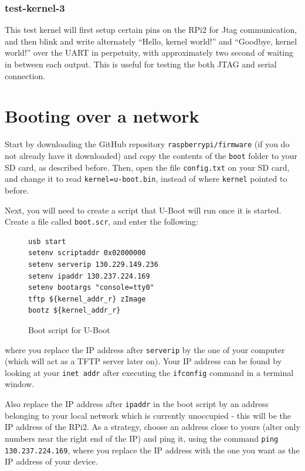 \documentclass[a4paper,11pt,reqno]{amsart}
\begin{document}
\subsubsection{test-kernel-3}
This test kernel will first setup certain pins on the RPi2 for Jtag communication, and then blink and write alternately ``Hello, kernel world!'' and ``Goodbye, kernel world!'' over the UART in perpetuity, with approximately two second of waiting in between each output. This is useful for testing the both JTAG and serial connection.

\section{Booting over a network}
Start by downloading the GitHub repository \texttt{raspberrypi/firmware} (if you do not already have it downloaded) and copy the contents of the \texttt{boot} folder to your SD card, as described before. Then, open the file \texttt{config.txt} on your SD card, and change it to read \texttt{kernel=u-boot.bin}, instead of where \texttt{kernel} pointed to before.

Next, you will need to create a script that U-Boot will run once it is started. Create a file called \texttt{boot.scr}, and enter the following:

\begin{figure}[hb]
\begin{center}
\begin{BVerbatim}
usb start
setenv scriptaddr 0x02000000
setenv serverip 130.229.149.236
setenv ipaddr 130.237.224.169
setenv bootargs "console=tty0"
tftp ${kernel_addr_r} zImage
bootz ${kernel_addr_r}
\end{BVerbatim}
\end{center}
\caption{Boot script for U-Boot}
\label{fig:boots}
\end{figure}

where you replace the IP address after \texttt{serverip} by the one of your computer (which will act as a TFTP server later on). Your IP address can be found by looking at your \texttt{inet addr} after executing the \texttt{ifconfig} command in a terminal window.

Also replace the IP address after \texttt{ipaddr} in the boot script by an address belonging to your local network which is currently unoccupied - this will be the IP address of the RPi2. As a strategy, choose an address close to yours (alter only numbers near the right end of the IP) and ping it, using the command \texttt{ping 130.237.224.169}, where you replace the IP address with the one you want as the IP address of your device.
\end{document}
